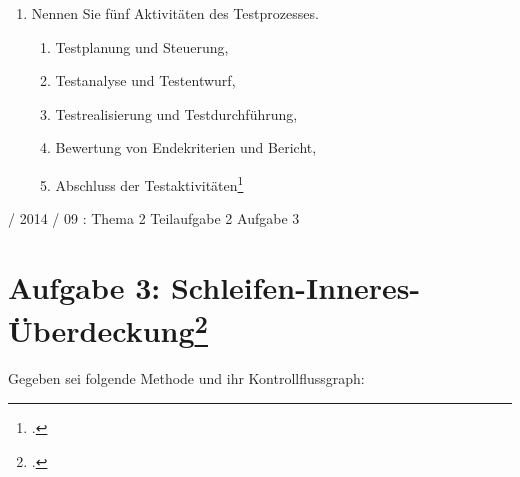 \documentclass{lehramt-informatik}
\begin{document}
\begin{enumerate}
\item Nennen Sie fünf Aktivitäten des Testprozesses.

\begin{antwort}
\begin{enumerate}
\item Testplanung und Steuerung,

\item Testanalyse und Testentwurf,

\item Testrealisierung und Testdurchführung,

\item Bewertung von Endekriterien und Bericht,

\item Abschluss der Testaktivitäten\footcite[Kapitel „5.6.2 Der
traditionelle Testprozess“ Seite 135-138]{schatten}
\end{enumerate}
\end{antwort}

\end{enumerate}

%

 / 2014 / 09 : Thema 2 Teilaufgabe 2 Aufgabe 3

%

\section{Aufgabe 3: Schleifen-Inneres-Überdeckung\footcite{sosy:ab:7}}

Gegeben sei folgende Methode und ihr Kontrollflussgraph:

\begin{multicols}{2}

\end{multicols}
\end{document}
